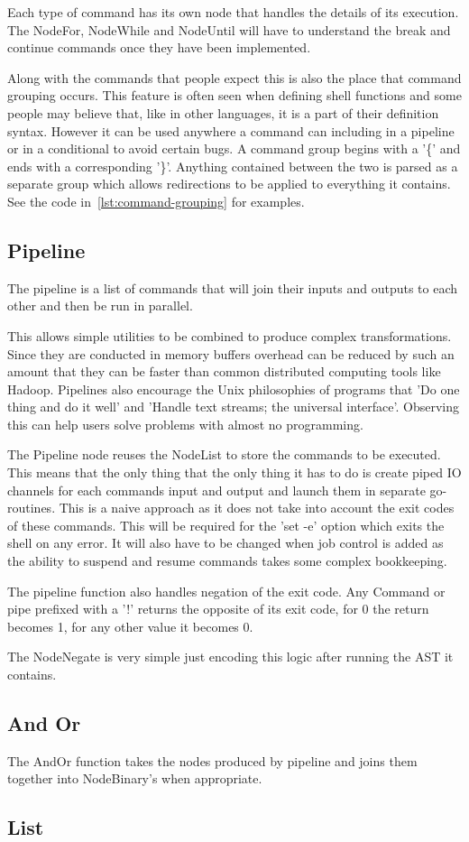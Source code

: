 Each type of command has its own node that handles the details of its execution.
The NodeFor, NodeWhile and NodeUntil will have to understand the break and continue commands once they have been implemented.

Along with the commands that people expect this is also the place that command grouping occurs.
This feature is often seen when defining shell functions and some people may believe that, like in other languages, it is a part of their definition syntax.
However it can be used anywhere a command can including in a pipeline or in a conditional to avoid certain bugs.
A command group begins with a '\{' and ends with a corresponding '\}'.
Anything contained between the two is parsed as a separate group which allows redirections to be applied to everything it contains.
See the code in~\ref{lst:command-grouping} for examples.

\subsection{Pipeline}
The pipeline is a list of commands that will join their inputs and outputs to each other and then be run in parallel.

This allows simple utilities to be combined to produce complex transformations.
Since they are conducted in memory buffers overhead can be reduced by such an amount that they can be faster than common distributed computing tools like Hadoop\cite{AdamD45:online}.
Pipelines also encourage the Unix philosophies of programs that 'Do one thing and do it well' and 'Handle text streams; the universal interface'.
Observing this can help users solve problems with almost no programming\cite{LITERATE-VS-SHELL}.

The Pipeline node reuses the NodeList to store the commands to be executed.
This means that the only thing that the only thing it has to do is create piped IO channels for each commands input and output and launch them in separate go-routines.
This is a naive approach as it does not take into account the exit codes of these commands.
This will be required for the 'set -e' option which exits the shell on any error.
It will also have to be changed when job control is added as the ability to suspend and resume commands takes some complex bookkeeping.

The pipeline function also handles negation of the exit code.
Any Command or pipe prefixed with a '!' returns the opposite of its exit code, for 0 the return becomes 1, for any other value it becomes 0.

The NodeNegate is very simple just encoding this logic after running the AST it contains.

\subsection{And Or}
The AndOr function takes the nodes produced by pipeline and joins them together into NodeBinary's when appropriate.





\subsection{List}













